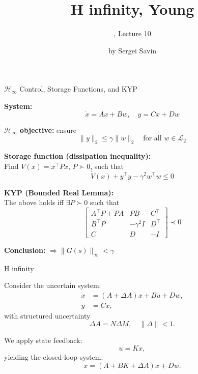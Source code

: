 \documentclass{beamer}
\title{H infinity, Young}
\subtitle{\mycoursetitle, Lecture 10}
\author{by Sergei Savin}
\date{\mydate}
\begin{document}
\maketitle



\begin{frame}{\texorpdfstring{$\mathcal{H}_\infty$}{} Control, Storage Functions, and KYP}
	\begin{flushleft}
		
		{\small
		\textbf{System:}
		\[
		\dot{x} = Ax + Bw, \quad y = Cx + Dw
		\]
		
		
		\textbf{$\mathcal{H}_\infty$ objective:} ensure
		\[
		\|y\|_2 \le \gamma \|w\|_2 \quad \text{for all } w \in \mathcal{L}_2
		\]
		
		
		\textbf{Storage function (dissipation inequality):} \\
		Find $V(x) = x^\top P x$, $P \succ 0$, such that
		\[
		\dot{V}(x) + y^\top y - \gamma^2 w^\top w \le 0
		\]
		
		\textbf{KYP (Bounded Real Lemma):} \\
		The above holds iff $\exists P \succ 0$ such that
		\[
		\begin{bmatrix}
			A^\top P + PA & PB & C^\top \\
			B^\top P & -\gamma^2 I & D^\top \\
			C & D & -I
		\end{bmatrix} \prec 0
		\]
		
		
		\textbf{Conclusion:} $\Rightarrow \|G(s)\|_\infty < \gamma$}
		
	\end{flushleft}
	
\end{frame}


\begin{frame}{H infinity}
	\begin{flushleft}
		
Consider the uncertain system:
\begin{align*}
	\dot{x} &= (A + \Delta A)x + Bu + Dw, \\
	y &= Cx,
\end{align*}
with structured uncertainty
\[
\Delta A = N \Delta M, \quad \|\Delta\| < 1.
\]

We apply state feedback:
\[
u = Kx,
\]
yielding the closed-loop system:
\[
\dot{x} = (A + BK + \Delta A)x + Dw.
\]
		
	\end{flushleft}
\end{frame}
\end{document}
